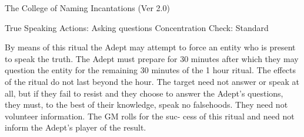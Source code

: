 \begin{Chapter}{The College of Naming Incantations (Ver 2.0)}
\begin{ritual}[R-7]{True Speaking }
Actions: Asking questions 
Concentration Check: Standard 
\begin{effects}
 By  means  of  this  ritual  the  Adept  may 
attempt  to  force  an  entity  who  is  present  to  speak 
the  truth.  The  Adept  must  prepare  for  30  minutes 
after  which  they  may  question  the  entity  for  the 
remaining  30  minutes  of  the  1  hour  ritual.  The 
effects  of  the  ritual  do  not  last  beyond  the  hour. 
The  target  need  not  answer  or  speak  at  all,  but  if 
they  fail  to  resist  and  they  choose  to  answer  the 
Adept’s  questions,  they  must,  to  the  best  of  their 
knowledge,  speak  no  falsehoods.  They  need  not 
volunteer  information.  The  GM  rolls  for  the  suc-
cess of this ritual and need not inform the Adept’s 
player of the result. 
\end{effects}
\end{ritual}
\end{Chapter}

